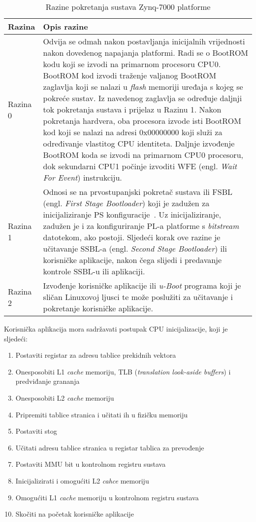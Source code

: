 \documentclass[times, utf8, diplomski, numeric]{fer}
\begin{document}
\begin{table}[H]
  \centering
  \caption{Razine pokretanja sustava Zynq-7000 platforme}
  \label{boot_stages}
  \begin{tabular}{|| p{2cm} | p{12cm} ||}
    \hline
    \textbf{Razina} & \textbf{Opis razine} \\
    \hline\hline
    Razina 0 & Odvija se odmah nakon postavljanja inicijalnih vrijednosti nakon dovedenog napajanja platformi.
    Radi se o BootROM kodu koji se izvodi na primarnom procesoru CPU0. BootROM kod izvodi traženje valjanog
    BootROM zaglavlja koji se nalazi u \textit{flash} memoriji uređaja s kojeg se pokreće sustav. Iz navedenog
    zaglavlja se određuje daljnji tok pokretanja sustava i prijelaz u Razinu 1. Nakon pokretanja hardvera, oba
    procesora izvode isti BootROM kod koji se nalazi na adresi 0x00000000 koji služi za određivanje vlastitog
    CPU identiteta. Daljnje izvođenje BootROM koda se izvodi na primarnom CPU0 procesoru, dok sekundarni CPU1
    počinje izvoditi WFE (engl. \textit{Wait For Event}) instrukciju.\\
    \hline
    Razina 1 & Odnosi se na prvostupanjski pokretač sustava ili FSBL (engl. \textit{First Stage Bootloader}) koji
    je zadužen za inicijaliziranje PS konfiguracije~\cite{zynq_swdg}. Uz inicijaliziranje, zadužen je i za konfiguriranje PL-a
    platforme s \textit{bitstream} datotekom, ako postoji. Sljedeći korak ove razine je učitavanje SSBL-a (engl.
    \textit{Second Stage Bootloader}) ili korisničke aplikacije, nakon čega slijedi i predavanje kontrole SSBL-u
    ili aplikaciji.\\
    \hline
    Razina 2 & Izvođenje korisničke aplikacije ili \textit{u-Boot} programa koji je sličan Linuxovoj ljusci te može
    poslužiti za učitavanje i pokretanje korisničke aplikacije.\\
    \hline
  \end{tabular}
\end{table}
Korisnička aplikacija mora sadržavati postupak CPU inicijalizacije, koji je sljedeći:
\begin{enumerate}
  \item{Postaviti registar za adresu tablice prekidnih vektora}
  \item{Onesposobiti L1 \textit{cache} memoriju, TLB (\textit{translation look-aside buffers}) i predviđanje grananja}
  \item{Onesposobiti L2 \textit{cache} memoriju}
  \item{Pripremiti tablice stranica i učitati ih u fizičku memoriju}
  \item{Postaviti stog}
  \item{Učitati adresu tablice stranica u registar tablica za prevođenje}
  \item{Postaviti MMU bit u kontrolnom registru sustava}
  \item{Inicijalizirati i omogućiti L2 \textit{cahce} memoriju}
  \item{Omogućiti L1 \textit{cache} memoriju u kontrolnom registru sustava}
  \item{Skočiti na početak korisničke aplikacije}
\end{enumerate}
\end{document}
